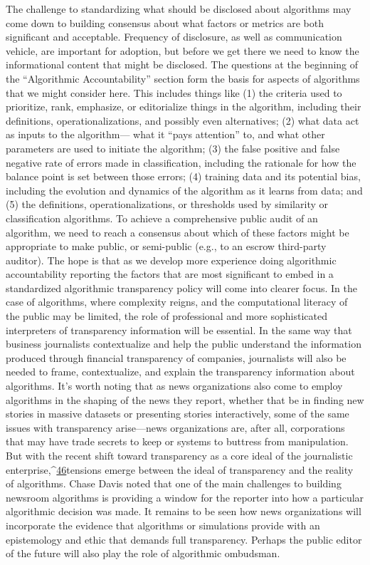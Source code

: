 The challenge to standardizing what should be disclosed about algorithms may come down to building consensus about what factors or metrics are both significant and acceptable. Frequency of disclosure, as well as communication vehicle, are important for adoption, but before we get there we need to know the informational content that might be disclosed. The questions at the beginning of the ``Algorithmic Accountability'' section form the basis for aspects of algorithms that we might consider here. This includes things like (1) the criteria used to prioritize, rank, emphasize, or editorialize things in the algorithm, including their definitions, operationalizations, and possibly even alternatives; (2) what data act as inputs to the algorithm— what it ``pays attention'' to, and what other parameters are used to initiate the algorithm; (3) the false positive and false negative rate of errors made in classification, including the rationale for how the balance point is set between those errors; (4) training data and its potential bias, including the evolution and dynamics of the algorithm as it learns from data; and (5) the definitions, operationalizations, or thresholds used by similarity or classification algorithms. To achieve a comprehensive public audit of an algorithm, we need to reach a consensus about which of these factors might be appropriate to make public, or semi-public (e.g., to an escrow third-party auditor). The hope is that as we develop more experience doing algorithmic accountability reporting the factors that are most significant to embed in a standardized algorithmic transparency policy will come into clearer focus. 
In the case of algorithms, where complexity reigns, and the computational literacy of the public may be limited, the role of professional and more sophisticated interpreters of transparency information will be essential. In the same way that business journalists contextualize and help the public understand the information produced through financial transparency of companies, journalists will also be needed to frame, contextualize, and explain the transparency information about algorithms. 
It's worth noting that as news organizations also come to employ algorithms in the shaping of the news they report, whether that be in finding new stories in massive datasets or presenting stories interactively, some of the same issues with transparency arise—news organizations are, after all, corporations that may have trade secrets to keep or systems to buttress from manipulation. But with the recent shift toward transparency as a core ideal of the journalistic enterprise,^{\href{#endnotes}{46}}tensions emerge between the ideal of transparency and the reality of algorithms. Chase Davis noted that one of the main challenges to building newsroom algorithms is providing a window for the reporter into how a particular algorithmic decision was made. It remains to be seen how news organizations will incorporate the evidence that algorithms or simulations provide with an epistemology and ethic that demands full transparency. Perhaps the public editor of the future will also play the role of algorithmic ombudsman. 
